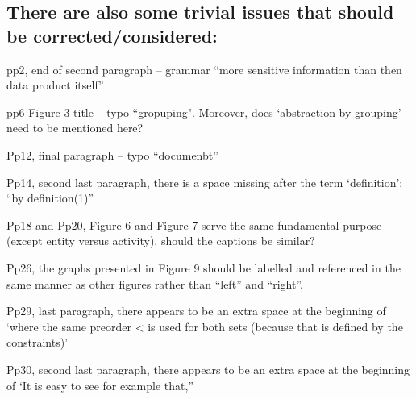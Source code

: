 \documentclass{article}
\begin{document}
\subsection*{There are also some trivial issues that should be corrected/considered:}

pp2, end of second paragraph – grammar “more sensitive information than then data product itself”

pp6 Figure 3 title – typo “gropuping".  Moreover, does ‘abstraction-by-grouping’ need to 
be mentioned here?

Pp12, final paragraph – typo “documenbt”

Pp14, second last paragraph, there is a space missing after the term ‘definition’: “by definition(1)”

Pp18 and Pp20, Figure 6 and Figure 7 serve the same fundamental purpose (except entity versus activity), should the captions be similar?

Pp26, the graphs presented in Figure 9 should be labelled and referenced in the same manner as other figures rather than “left” and “right”.

Pp29, last paragraph, there appears to be an extra space at the beginning of ‘where the same preorder < is used for both sets (because that is defined by the constraints)’

Pp30, second last paragraph, there appears to be an extra space at the beginning of ‘It is easy to see for example that,”






\end{document}
